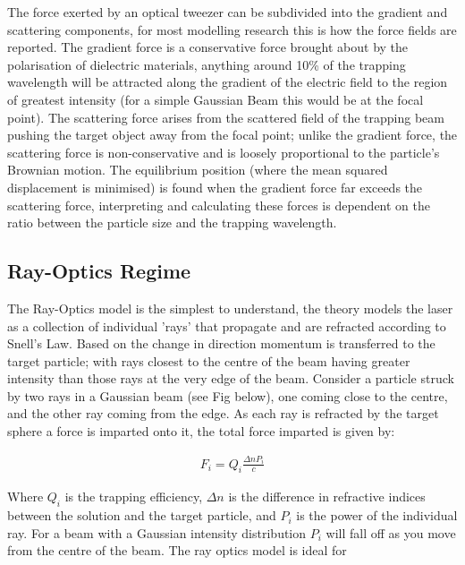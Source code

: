 The force exerted by an optical tweezer can be subdivided into the gradient and scattering components, for most modelling research this is how the force fields are reported. The gradient force is a conservative force brought about by the polarisation of dielectric materials, anything around 10\% of the trapping wavelength will be attracted along the gradient of the electric field to the region of greatest intensity (for a simple Gaussian Beam this would be at the focal point). The scattering force arises from the scattered field of the trapping beam pushing the target object away from the focal point; unlike the gradient force, the scattering force is non-conservative and is loosely proportional to the particle's Brownian motion. The equilibrium position (where the mean squared displacement is minimised) is found when the gradient force far exceeds the scattering force, interpreting and calculating these forces is dependent on the ratio between the particle size and the trapping wavelength.

\subsection{Ray-Optics Regime}
The Ray-Optics model is the simplest to understand, the theory models the laser as a collection of individual 'rays' that propagate and are refracted according to Snell's Law. Based on the change in direction momentum is transferred to the target particle; with rays closest to the centre of the beam having greater intensity than those rays at the very edge of the beam. Consider a particle struck by two rays in a Gaussian beam (see Fig below), one coming close to the centre, and the other ray coming from the edge. As each ray is refracted by the target sphere a force is imparted onto it, the total force imparted is given by:

\begin{align}
	F_i = Q_i\frac{\Delta n P_i}{c}
\end{align}

Where $Q_i$ is the trapping efficiency, $\Delta n$ is the difference in refractive indices between the solution and the target particle, and $P_i$ is the power of the individual ray. For a beam with a Gaussian intensity distribution $P_i$ will fall off as you move from the centre of the beam. The ray optics model is ideal for  

